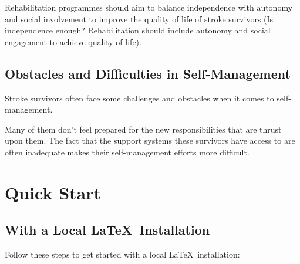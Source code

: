 Rehabilitation programmes should aim to balance independence with autonomy and social involvement to improve the quality of life of stroke survivors (Is independence enough? Rehabilitation should include autonomy and social engagement to achieve quality of life).  

\subsection{Obstacles and Difficulties in Self-Management}
\label{sec:ObstaclesandDifficultiesinSelf-Management}
Stroke survivors often face some challenges and obstacles when it comes to self-management. 


Many of them don't feel prepared for the new responsibilities that are thrust upon them. 
The fact that the support systems these survivors have access to are often inadequate makes their self-management efforts more difficult.





















\section{Quick Start}
\label{sec:quick_started}

\subsection{With a Local \LaTeX\ Installation} %
\label{sub:with_a_local_latex_installation}

Follow these steps to get started with a local \LaTeX\ installation:

